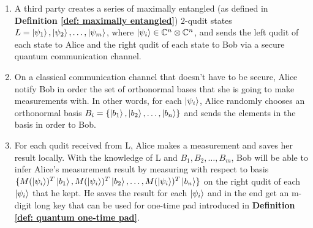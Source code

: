 \begin{enumerate}
    \item A third party creates a series of maximally entangled (as defined in \textbf{Definition \ref{def: maximally entangled}}) $2$-qudit states $L={\ket{\psi_1}, \ket{\psi_2}, \hdots, \ket{\psi_m}}$, where $\ket{\psi_i} \in \mathbb{C}^n \otimes \mathbb{C}^n$, and sends the left qudit of each state to Alice and the right qudit of each state to Bob via a secure quantum communication channel.
    \item On a classical communication channel that doesn't have to be secure, Alice notify Bob in order the set of orthonormal bases that she is going to make measurements with. In other words, for each $\ket{\psi_i}$, Alice randomly chooses an orthonormal basis $B_i=\{\ket{b_1}, \ket{b_2}, \hdots, \ket{b_n}\}$ and sends the elements in the basis in order to Bob.
    \item For each qudit received from L, Alice makes a measurement and saves her result locally. With the knowledge of L and $B_1, B_2, \hdots, B_m$, Bob will be able to infer Alice's measurement result by measuring with respect to basis $\{M(\ket{\psi_i})^T \ket{b_1}, M(\ket{\psi_i})^T \ket{b_2}, \hdots, M(\ket{\psi_i})^T \ket{b_n}\}$ on the right qudit of each $\ket{\psi_i}$ that he kept. He saves the result for each $\ket{\psi_i}$ and in the end get an m-digit long key that can be used for one-time pad introduced in \textbf{Definition \ref{def: quantum one-time pad}}.
\end{enumerate}